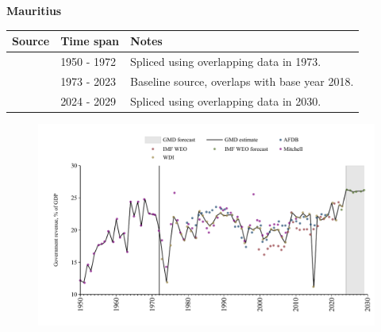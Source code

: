 \documentclass[12pt,a4paper,landscape]{article}
\begin{document}
\begin{adjustbox}{max totalsize={\paperwidth}{\paperheight},center}
\begin{minipage}[t][\textheight][t]{\textwidth}
\vspace*{0.5cm}
{}
\begin{center}
{\Large\bfseries Mauritius}
\end{center}
\vspace{0.5cm}
\begin{table}[H]
\centering
\small
\begin{tabular}{|l|l|l|}
\hline
\textbf{Source} & \textbf{Time span} & \textbf{Notes} \\
\hline
\rowcolor{white}\cite{Mitchell}& 1950 - 1972 &Spliced using overlapping data in 1973.\\
\rowcolor{lightgray}\cite{WDI}& 1973 - 2023 &Baseline source, overlaps with base year 2018.\\
\rowcolor{white}\cite{IMF_WEO_forecast}& 2024 - 2029 &Spliced using overlapping data in 2030.\\
\hline
\end{tabular}
\end{table}
\begin{figure}[H]
\centering
\includegraphics[width=\textwidth,height=0.6\textheight,keepaspectratio]{graphs/MUS_govrev_GDP.pdf}
\end{figure}
\end{minipage}
\end{adjustbox}
\end{document}
